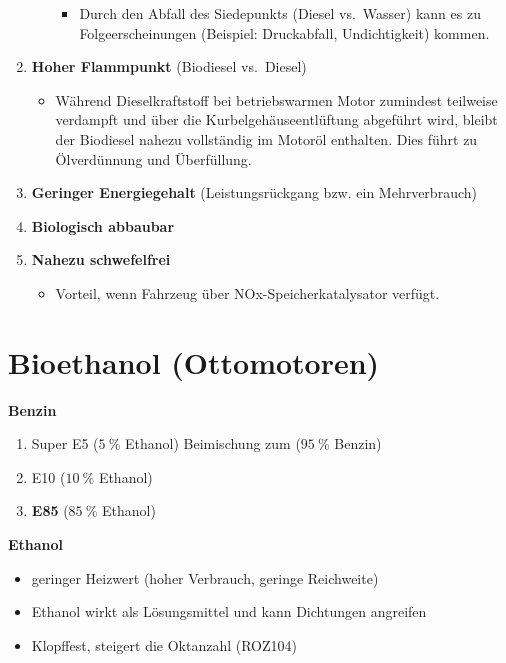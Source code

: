 \begin{enumerate}
\begin{itemize}
    \begin{itemize}
    \item
      Durch den Abfall des Siedepunkts (Diesel vs.~Wasser) kann es zu
      Folgeerscheinungen (Beispiel: Druckabfall, Undichtigkeit) kommen.
    \end{itemize}
  \end{itemize}
\item
  \textbf{Hoher Flammpunkt} (Biodiesel vs.~Diesel)

  \begin{itemize}
  \item
    Während Dieselkraftstoff bei betriebswarmen Motor zumindest
    teilweise verdampft und über die Kurbelgehäuseentlüftung abgeführt
    wird, bleibt der Biodiesel nahezu vollständig im Motoröl enthalten.
    Dies führt zu Ölverdünnung und Überfüllung.
  \end{itemize}
\item
  \textbf{Geringer Energiegehalt} (Leistungsrückgang bzw. ein
  Mehrverbrauch)
\item
  \textbf{Biologisch abbaubar}
\item
  \textbf{Nahezu schwefelfrei}

  \begin{itemize}
  \item
    Vorteil, wenn Fahrzeug über NOx-Speicherkatalysator verfügt.
  \end{itemize}
\end{enumerate}

\section{Bioethanol (Ottomotoren)}\label{bioethanol-ottomotoren}

\textbf{Benzin}

\begin{enumerate}
\item
  Super E5 ($5~\%$ Ethanol) Beimischung zum ($95~\%$ Benzin)
\item
  E10 ($10~\%$ Ethanol)
\item
  \textbf{E85} ($85~\%$ Ethanol)
\end{enumerate}

\textbf{Ethanol}

\begin{itemize}
\item
  geringer Heizwert (hoher Verbrauch, geringe Reichweite)
\item
  Ethanol wirkt als Lösungsmittel und kann Dichtungen angreifen
\item
  Klopffest, steigert die Oktanzahl (ROZ104)
\end{itemize}

